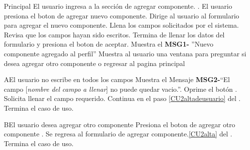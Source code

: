 	\begin{UCtrayectoria}{Principal}
		\UCpaso[\UCactor] El usuario ingresa a la secci\'on de agregar componente. \label{CU2alta}.
		\UCpaso[\UCactor] El usuario presiona el boton de agregar nuevo componente.%
		\UCpaso Dirige al usuario al formulario para agregar el nuevo componente.%
		\UCpaso[\UCactor] Llena los campos solicitados por el sistema.
		\UCpaso Revisa que los campos hayan sido escritos. \label{CU2altadeusuario}
		\UCpaso[\UCactor] Termina de llenar los datos del formulario y presiona el boton de aceptar. 
		\UCpaso Muestra el {\bf MSG1-} ''Nuevo componente agregado al perfil''%
		\UCpaso Muestra al usuario una ventana para preguntar si desea agregar otro componente o regresar al pagina principal  
		
			
	\end{UCtrayectoria}
		
		\begin{UCtrayectoriaA}{A}{El usuario no escribe en todos los campos}
			\UCpaso Muestra el Mensaje {\bf MSG2-}``El campo [{\em nombre del campo a llenar}] no puede quedar vacio.''.
			\UCpaso[\UCactor] Oprime el botón .
			\UCpaso Solicita llenar el campo requerido. 
			\UCpaso Continua en el paso \ref{CU2altadeusuario} del .
			\UCpaso[] Termina el caso de uso.
		\end{UCtrayectoriaA}
		
		\begin{UCtrayectoriaA}{B}{El usuario desea agregar otro componente}
			\UCpaso[\UCactor] Presiona el boton de agregar otro componente .
			\UCpaso Se regresa al formulario de agregar componente.\ref{CU2alta} del .
			\UCpaso[] Termina el caso de uso.
		\end{UCtrayectoriaA}

